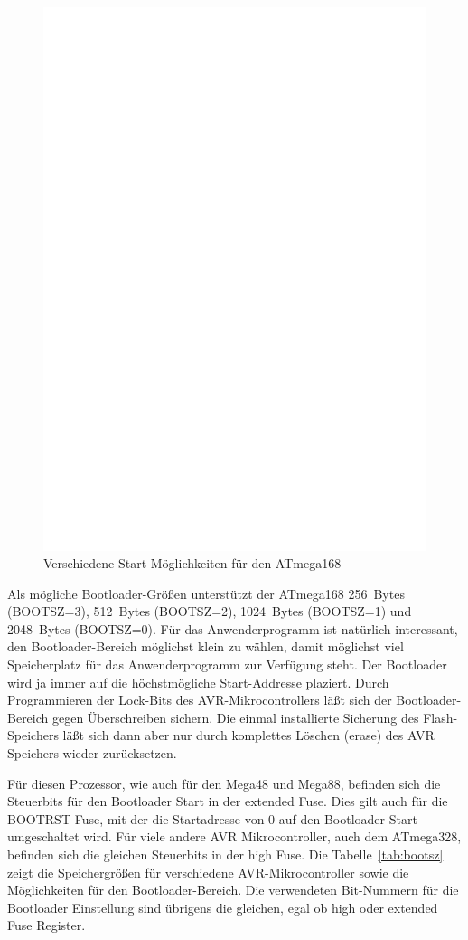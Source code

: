 \begin{figure}[H]
\centering
\includegraphics[width=12cm]{../FIG/boot_pages.eps}
\caption{Verschiedene Start-Möglichkeiten für den ATmega168}
\label{fig:pages}
\end{figure}


Als mögliche Bootloader-Größen unterstützt der ATmega168 256~Bytes (BOOTSZ=3),
512~Bytes (BOOTSZ=2), 1024~Bytes (BOOTSZ=1) und 2048~Bytes (BOOTSZ=0).
Für das Anwenderprogramm ist natürlich interessant, den Bootloader-Bereich
möglichst klein zu wählen, damit möglichst viel Speicherplatz für das
Anwenderprogramm zur Verfügung steht.
Der Bootloader wird ja immer auf die höchstmögliche Start-Addresse plaziert.
Durch Programmieren der Lock-Bits des AVR-Mikrocontrollers läßt sich
der Bootloader-Bereich  gegen Überschreiben sichern. Die einmal installierte
Sicherung des Flash-Speichers läßt sich dann aber nur durch komplettes Löschen (erase)
des AVR Speichers wieder zurücksetzen.


Für diesen Prozessor, wie auch für den Mega48 und Mega88, befinden sich
die Steuerbits für den Bootloader Start in der extended Fuse.
Dies gilt auch für die BOOTRST Fuse, mit der die Startadresse von 0
auf den Bootloader Start umgeschaltet wird.
Für viele andere AVR Mikrocontroller, auch dem ATmega328, befinden sich
die gleichen Steuerbits in der high Fuse.
Die Tabelle~\ref{tab:bootsz} zeigt die Speichergrößen für verschiedene
AVR-Mikrocontroller sowie die Möglichkeiten für den Bootloader-Bereich. 
Die verwendeten Bit-Nummern für die Bootloader Einstellung sind übrigens
die gleichen, egal ob high oder extended Fuse Register.


